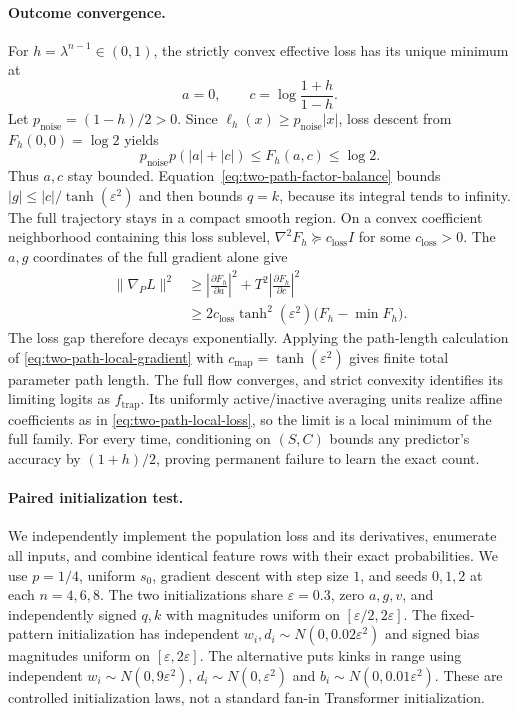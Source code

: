 \paragraph{Outcome convergence.}
For $h=\lambda^{n-1}\in(0,1)$, the strictly convex effective loss has its unique
minimum at
\[
 a=0,\qquad c=\log\frac{1+h}{1-h}.
\]
Let $p_{\mathrm{noise}}=(1-h)/2>0$. Since
$\ell_h(x)\ge p_{\mathrm{noise}}|x|$, loss descent from $F_h(0,0)=\log2$ yields
\[
 p_{\mathrm{noise}}p(|a|+|c|)\le F_h(a,c)\le\log2.
\]
Thus $a,c$ stay bounded. Equation~\eqref{eq:two-path-factor-balance} bounds
$|g|\le |c|/\tanh(\varepsilon^2)$ and then bounds $q=k$, because its integral
tends to infinity. The full trajectory stays in a compact smooth region.
On a convex coefficient neighborhood containing this loss sublevel,
$\nabla^2F_h\succeq c_{\mathrm{loss}}I$ for some $c_{\mathrm{loss}}>0$.
The $a,g$ coordinates of the full gradient alone give
\[
\begin{aligned}
 \|\nabla_P L\|^2
 &\ge \left|\frac{\partial F_h}{\partial a}\right|^2
       +T^2\left|\frac{\partial F_h}{\partial c}\right|^2\\
 &\ge 2c_{\mathrm{loss}}\tanh^2(\varepsilon^2)
       \bigl(F_h-\min F_h\bigr).
\end{aligned}
\]
The loss gap therefore decays exponentially. Applying the path-length calculation
of \cref{eq:two-path-local-gradient} with
$c_{\mathrm{map}}=\tanh(\varepsilon^2)$ gives finite total parameter path length.
The full flow converges, and strict convexity identifies its limiting logits as
$f_{\mathrm{trap}}$. Its uniformly active/inactive averaging units realize affine
coefficients as in \cref{eq:two-path-local-loss}, so the limit is a local minimum
of the full family. For every time, conditioning on $(S,C)$ bounds any predictor's
accuracy by $(1+h)/2$, proving permanent failure to learn the exact count.

\paragraph{Paired initialization test.}
We independently implement the population loss and its derivatives, enumerate all
inputs, and combine identical feature rows with their exact probabilities.
We use $p=1/4$, uniform $s_0$, gradient descent with step size $1$, and seeds $0,1,2$
at each $n=4,6,8$. The two initializations share $\varepsilon=0.3$, zero $a,g,v$,
and independently signed $q,k$ with magnitudes uniform on
$[\varepsilon/2,2\varepsilon]$.
The fixed-pattern initialization has independent
$w_i,d_i\sim N(0,0.02\varepsilon^2)$ and signed bias magnitudes uniform on
$[\varepsilon,2\varepsilon]$.
The alternative puts kinks in range using independent
$w_i\sim N(0,9\varepsilon^2)$, $d_i\sim N(0,\varepsilon^2)$ and
$b_i\sim N(0,0.01\varepsilon^2)$.
These are controlled initialization laws, not a standard fan-in Transformer initialization.

